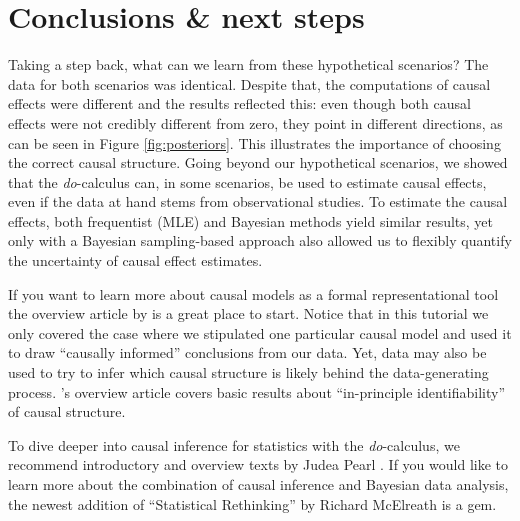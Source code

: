 \documentclass[nobib]{tufte-handout}
\newcommand{\docalc}{\emph{do}-calculus\xspace}
\begin{document}
\section{Conclusions \& next steps}
\label{sec:conclusions--next}

Taking a step back, what can we learn from these hypothetical scenarios?
The data for both scenarios was identical.
Despite that, the computations of causal effects were different and the results reflected this: even though both causal effects were not credibly different from zero, they point in different directions, as can be seen in Figure \ref{fig:posteriors}.
This illustrates the importance of choosing the correct causal structure. 
Going beyond our hypothetical scenarios, we showed that the \docalc can, in some scenarios, be used to estimate causal effects, even if the data at hand stems from observational studies.
To estimate the causal effects, both frequentist (MLE) and Bayesian methods yield similar results, yet only with a Bayesian sampling-based approach also allowed us to flexibly quantify the uncertainty of causal effect estimates.

If you want to learn more about causal models as a formal representational tool the overview article by \citet{sep-causal-models} is a great place to start.
Notice that in this tutorial we only covered the case where we stipulated one particular causal model and used it to draw ``causally informed'' conclusions from our data.
Yet, data may also be used to try to infer which causal structure is likely behind the data-generating process.
\citeauthor{sep-causal-models}'s overview article covers basic results about ``in-principle identifiability'' of causal structure.

To dive deeper into causal inference for statistics with the \docalc, we recommend introductory and overview texts by Judea Pearl \citep{pearl2009causal,2016:Pearl-Judea-and}.
If you would like to learn more about the combination of causal inference and Bayesian data analysis, the newest addition of ``Statistical Rethinking'' by Richard McElreath is a gem.
\end{document}
